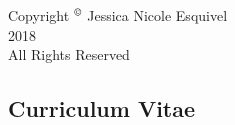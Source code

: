 \documentclass[hyperpdf,oneside,bindnopdf,usenames,dvipsnames,svgnames,table,longbibliography]{hepthesis}
\begin{document}
\begin{frontmatter}
\begin{center}
\end{center}
\thispagestyle{empty}
\let\cleardoublepage\clearpage

\vspace*{8cm}
\begin{center}
    Copyright $\textsuperscript{\textcopyright}$ Jessica Nicole Esquivel\\
    2018\\
    All Rights Reserved\\
\end{center}
\thispagestyle{empty}
\let\cleardoublepage\clearpage

% 
  
\end{frontmatter}

\begin{mainmatter}
  
  
  
  
  
  
  
  
  
\end{mainmatter}


\begin{backmatter}
  
\end{backmatter}




\begin{appendices}
 \setcounter{Curriculum Vitae}{126}
  \chapter{Curriculum Vitae}
  \renewcommand{\thechapter}{Curriculum Vitae}
  
\renewcommand{\thechapter}{Curriculum Vitae}
\end{appendices}
%  

\end{document}
